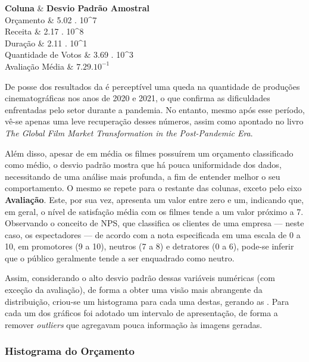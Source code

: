 %
{\hline
\textbf{Coluna} & 
\textbf{Desvio Padrão Amostral} \\\hline
Orçamento  &  5.02 . 10^7  \\\hline
Receita & 2.17 . 10^8 \\\hline
Duração  & 2.11 . 10^1  \\\hline
Quantidade de Votos  & 3.69 . 10^3  \\\hline
Avaliação Média & $7.29 . 10^{-1}$  \\\hline}%

De posse dos resultados da  é perceptível uma queda na quantidade de produções cinematográficas nos anos de 2020 e 2021, o que confirma as dificuldades enfrentadas pelo setor durante a pandemia\cite{variety-movie}. No entanto, mesmo após esse período, vê-se apenas uma leve recuperação desses números, assim como apontado no livro \textit{The Global Film Market Transformation in the Post-Pandemic Era}\cite{globalfilmmarket}.

Além disso, apesar de em média os filmes possuírem um orçamento classificado como médio\cite{mid_budget}, o desvio padrão mostra que há pouca uniformidade dos dados, necessitando de uma análise mais profunda, a fim de entender melhor o seu comportamento. O mesmo se repete para o restante das colunas, exceto pelo eixo \textbf{Avaliação}. Este, por sua vez, apresenta um valor entre zero e um, indicando que, em geral, o nível de satisfação média com os filmes tende a um valor próximo a 7. Observando o conceito de \acrfull{NPS}\cite{nps_score}, que classifica os clientes de uma empresa — neste caso, os espectadores — de acordo com a nota especificada em uma escala de 0 a 10, em promotores (9 a 10), neutros (7 a 8) e detratores (0 a 6), pode-se inferir que o público geralmente tende a ser enquadrado como neutro.

Assim, considerando o alto desvio padrão dessas variáveis numéricas (com exceção da avaliação), de forma a obter uma visão mais abrangente da distribuição, criou-se um histograma para cada uma destas, gerando as . Para cada um dos gráficos foi adotado um intervalo de apresentação, de forma a remover \textit{outliers} que agregavam pouca informação às imagens geradas.

\subsubsection{Histograma do Orçamento}
%

